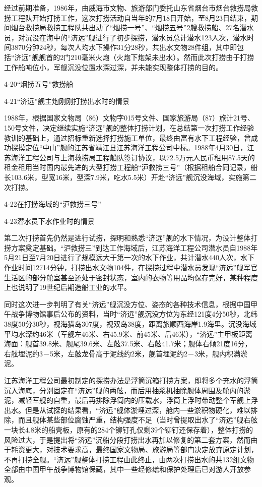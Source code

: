 \documentclass[12pt,UTF8]{ctexbook}
\begin{document}
经过前期准备，1986年，由威海市文物、旅游部门委托山东省烟台市烟台救捞局救捞工程队开始打捞工作，这次打捞活动自当年的7月18日开始，至8月23日结束，期间烟台救捞局救捞工程队共出动了“烟捞一号”、“烟捞五号”2艘救捞船、27名潜水员，对沉没在海中的“济远”舰进行了初步探捞，潜水员总计潜水123人次，潜水时间3870分钟24秒，每次人均水下操作31分28秒，共出水文物28件组，其中即包括“济远”舰舰首的2门210毫米火炮（火炮下炮架未出水）。然而此次打捞由于打捞工作船吨位小，军舰沉没位置水深过深，并未能实现整体打捞的目的。

4-20“烟捞五号”救捞船

4-21“济远”舰主炮刚刚打捞出水时的情景

1988年，根据国家文物局（86）文物字015号文件、国家旅游局（87）旅计21号、150号文件，决定继续实施“济远”舰的整体打捞计划，在总结第一次打捞工作经验教训的基础上，通过招标重新选择打捞施工单位，最终由富有水下工程经验，曾成功探摸定位“中山”舰的江苏省靖江县江苏海洋工程公司中标。1988年4月30日，江苏海洋工程公司与上海救捞局工程船队签订协议，以72.5万元人民币租用87.5天的租金租用当时国内最先进的大型打捞工程船“沪救捞三号”（根据租船合同记录，船长103.6米，型宽16米，型深7.9米，吃水5.5米）开赴“济远”舰沉没海域，实施第二次打捞。

4-22在打捞海域的“沪救捞三号”

4-23潜水员下水作业时的情景

第二次打捞首先仍然是进行试捞，探明和熟悉“济远”舰的水下情况，为设计整体打捞方案奠定基础。“沪救捞三”到达工作海域后，江苏海洋工程公司潜水员自1988年5月21日至7月20日进行了规模远大于第一次的水下作业，共计潜水440人次，水下作业时间12714分钟，打捞出水文物104件，在探捞过程中潜水员发现“济远”舰军官生活区的部分舱室甚至还处于密封状态，室内的衣物等用品均保存完好，某种程度上也说明了19世纪后期造船工业的水平。

同时这次进一步判明了有关“济远”舰沉没方位、姿态的各种技术信息，根据中国甲午战争博物馆事后公布的资料，当时“济远”舰沉没方位为东经121度4分50秒，北纬38度50分30秒，视海猫岛307度，视双岛38度，距离旅顺西海岸1.9海里。沉没海域平均水深约46米（军舰左46米、右45.9米、前45米、后46米），“济远”主甲板距离海面：舰首39.8米、舰尾39.6米、左舷37.5米、右舷41.7米；舰体右倾21度16分，右舷埋泥约3－5米，左舷龙骨高于泥线约2米，舰首埋泥约2－3米，舰内积满淤泥。

江苏海洋工程公司最初制定的探捞办法是浮筒沉箱打捞方案，即将多个充水的浮筒沉入海底，分别固定在“济远”舰的两舷，而后用抽浆机抽除舰体周围及舱内的淤泥，减轻军舰的自重，最后再排除浮筒内的压载水，浮筒上浮时带动整个军舰上浮出水。但是从试探的结果看，“济远”舰体淤埋过深，舱内一些淤积物硬化，难以排除，而且舰体某些部位腐蚀严重，结构强度不足（当时曾提取出水了“济远”舰右舷一块长4.8米的船壳板，原有的284个铆钉孔仅剩39个铆钉还保存着），整体打捞的风险过大，于是提出将“济远”沉船分段打捞出水再加以修复的第二套方案，然而由于耗资更大，对技术要求高，最终国家文物局、旅游局等部门决定放弃原定计划，不再打捞全舰。“济远”舰整体打捞工程由此终止，由两次打捞出水的共132组文物全部由中国甲午战争博物馆保藏，其中一些经修缮和保护处理后已对游人开放参观。
\end{document}
